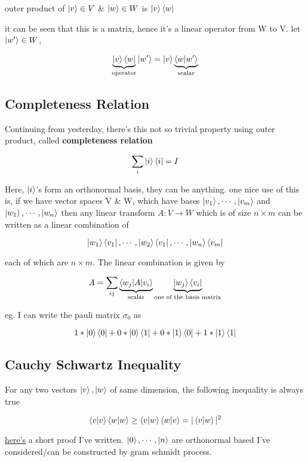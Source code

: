 outer product of $\ket{v} \in V$  \&  $\ket{w} \in W$ is $\ket{v}\bra{w}$

it can be seen that this is a matrix, hence it's a linear operator from W to V. let $\ket{w'} \in W$,

\begin{align*}
\underbrace{\ket{v}\bra{w}}_\text{operator}\ket{w'} =\ket{v} \underbrace{\braket{w|w'}}_\text{scalar}\end{align*}

\subsection{Completeness Relation}
Continuing from yesterday, there's this not so trivial property using outer product, called \textbf{completeness relation}

$$
\sum_i \ket{i}\bra{i} = I
$$

Here, $\ket{i}$’s form an orthonormal basis, they can be anything. one nice use of this is, if we have vector spaces V \& W, which have bases $\ket{v_1},\cdots,\ket{v_m}$ and $\ket{w_1},\cdots,\ket{w_n}$ then any linear transform $A : V \rightarrow W$ which is of size $n × m$  can be written as a linear combination of 

$$
\ket{w_1}\bra{v_1}, \cdots,\ket{w_2}\bra{v_1},\cdots,\ket{w_n}\bra{v_m}
$$

each of which are $n×m$. The linear combination is given by

$$
A = \sum_{ij} \underbrace{\braket{w_j|A|v_i}}_{\text{scalar}}\underbrace{\ket{w_j}\bra{v_i}}_{\text{one of the basis matrix}}
$$

eg. I can write the pauli matrix $\sigma_0$  as 

$$
1*\ket{0}\bra{0} + 0 *\ket{0}\bra{1} + \\0*\ket{1}\bra{0} + 1*\ket{1}\bra{1}
$$

\subsection{Cauchy Schwartz Inequality}

For any two vectors $\ket{v}, \ket{w}$ of same dimension, the following inequality is always true

$$
\braket{v|v}\braket{w|w} \geq \braket{v|w}\braket{w|v} = |\braket{v|w}|^2
$$

\href{https://drive.google.com/file/d/1u_q4FOFGTbASSS0xR9YSNNd0d1mMmaXg/view?usp=drive_link}{here's} a short proof I've written. $\ket{0},\cdots,\ket{n}$ are orthonormal based I've considered/can be constructed by gram schmidt process.

